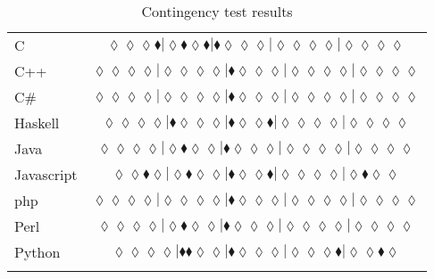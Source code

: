 \begin{table*}
{\begin{tabular}{l c}
C & $\scriptscriptstyle\lozenge\lozenge\lozenge\blacklozenge|\lozenge\blacklozenge\lozenge\blacklozenge|\blacklozenge\lozenge\lozenge\lozenge|\lozenge\lozenge\lozenge\lozenge|\lozenge\lozenge\lozenge\lozenge$ \\
C++ & $\scriptscriptstyle\lozenge\lozenge\lozenge\lozenge|\lozenge\lozenge\lozenge\lozenge|\blacklozenge\lozenge\lozenge\lozenge|\lozenge\lozenge\lozenge\lozenge|\lozenge\lozenge\lozenge\lozenge$ \\
C\# & $\scriptscriptstyle\lozenge\lozenge\lozenge\lozenge|\lozenge\lozenge\lozenge\lozenge|\blacklozenge\lozenge\lozenge\lozenge|\lozenge\lozenge\lozenge\lozenge|\lozenge\lozenge\lozenge\lozenge$ \\
Haskell & $\scriptscriptstyle\lozenge\lozenge\lozenge\lozenge|\blacklozenge\lozenge\lozenge\lozenge|\blacklozenge\lozenge\lozenge\blacklozenge|\lozenge\lozenge\lozenge\lozenge|\lozenge\lozenge\lozenge\lozenge$ \\
Java & $\scriptscriptstyle\lozenge\lozenge\lozenge\lozenge|\lozenge\blacklozenge\lozenge\lozenge|\blacklozenge\lozenge\lozenge\lozenge|\lozenge\lozenge\lozenge\lozenge|\lozenge\lozenge\lozenge\lozenge$ \\
Javascript & $\scriptscriptstyle\lozenge\lozenge\blacklozenge\lozenge|\lozenge\blacklozenge\lozenge\lozenge|\blacklozenge\lozenge\lozenge\blacklozenge|\lozenge\lozenge\lozenge\lozenge|\lozenge\blacklozenge\lozenge\lozenge$ \\
{\sc php} & $\scriptscriptstyle\lozenge\lozenge\lozenge\lozenge|\lozenge\lozenge\lozenge\lozenge|\blacklozenge\lozenge\lozenge\lozenge|\lozenge\lozenge\lozenge\lozenge|\lozenge\lozenge\lozenge\lozenge$ \\
Perl & $\scriptscriptstyle\lozenge\lozenge\lozenge\lozenge|\lozenge\blacklozenge\lozenge\lozenge|\blacklozenge\lozenge\lozenge\lozenge|\lozenge\lozenge\lozenge\lozenge|\lozenge\lozenge\lozenge\lozenge$ \\
Python & $\scriptscriptstyle\lozenge\lozenge\lozenge\lozenge|\blacklozenge\blacklozenge\lozenge\lozenge|\blacklozenge\lozenge\lozenge\lozenge|\lozenge\lozenge\lozenge\blacklozenge|\lozenge\lozenge\blacklozenge\lozenge$ \\

\hline
& \\
\end{tabular}
}
\caption{Contingency test results}
\label{tbl:contingency-test-results}
\end{table*}

